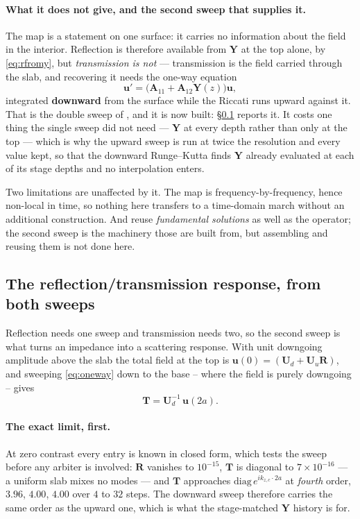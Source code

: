 \documentclass[11pt,a4paper]{article}
\newcommand{\bA}{\mathbf{A}}
\newcommand{\bU}{\mathbf{U}}
\newcommand{\bT}{\mathbf{T}}
\newcommand{\bu}{\mathbf{u}}
\newcommand{\bR}{\mathbf{R}}
\newcommand{\bY}{\mathbf{Y}}
\begin{document}
\paragraph{What it does not give, and the second sweep that supplies it.}
The map is a statement on one surface: it carries no information about the field
in the interior.  Reflection is therefore available from $\bY$ at the top alone,
by \eqref{eq:rfromy}, but \emph{transmission is not} --- transmission is the
field carried through the slab, and recovering it needs the one-way equation
\begin{equation}\label{eq:oneway}
  \bu' = \bigl(\bA_{11}+\bA_{12}\bY(z)\bigr)\bu ,
\end{equation}
integrated \textbf{downward} from the surface while the Riccati runs upward
against it.  That is the double sweep of \cite{haines2004}, and it is now built:
\S\ref{sec:rt} reports it.  It costs one thing the single sweep did not need ---
$\bY$ at every depth rather than only at the top --- which is why the upward
sweep is run at twice the resolution and every value kept, so that the downward
Runge--Kutta finds $\bY$ already evaluated at each of its stage depths and no
interpolation enters.

Two limitations are unaffected by it.  The map is frequency-by-frequency, hence
non-local in time, so nothing here transfers to a time-domain march without an
additional construction.  And \cite{haines2004} reuse \emph{fundamental
solutions} as well as the operator; the second sweep is the machinery those are
built from, but assembling and reusing them is not done here.

\subsection{The reflection/transmission response, from both
sweeps}\label{sec:rt}

Reflection needs one sweep and transmission needs two, so the second sweep is
what turns an impedance into a scattering response.  With unit downgoing
amplitude above the slab the total field at the top is
$\bu(0)=(\bU_d+\bU_u\bR)$, and sweeping \eqref{eq:oneway} down to the base --
where the field is purely downgoing -- gives
\begin{equation}\label{eq:tfromsweep}
  \bT = \bU_d^{-1}\,\bu(2a) .
\end{equation}

\paragraph{The exact limit, first.}  At zero contrast every entry is known in
closed form, which tests the sweep before any arbiter is involved: $\bR$
vanishes to $10^{-15}$, $\bT$ is diagonal to $7\times10^{-16}$ --- a uniform
slab mixes no modes --- and $\bT$ approaches
$\mathrm{diag}\,e^{ik_{z,c}\cdot2a}$ at \emph{fourth} order, $3.96$, $4.00$,
$4.00$ over $4$ to $32$ steps.  The downward sweep therefore carries the same
order as the upward one, which is what the stage-matched $\bY$ history is for.
\end{document}
